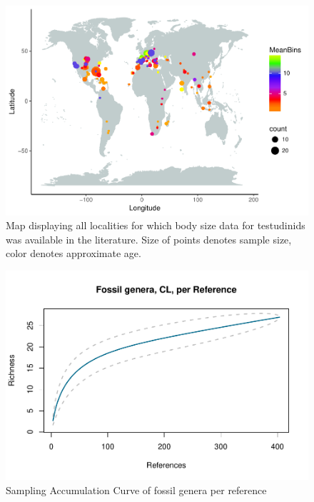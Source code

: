 \begin{figure}[htbp]
	\centering
	\includegraphics{MA_JJ_files/figure-latex/MapCL-1.pdf}
	\caption{Map displaying all localities for which body size data for
		testudinids was available in the literature. Size of points denotes
		sample size, color denotes approximate age.}
\end{figure}




\begin{figure}[htbp]
	\centering
	\includegraphics{MA_JJ_files/figure-latex/SACGenera-1.pdf}
	\caption{Sampling Accumulation Curve of fossil genera per reference}
\end{figure}

\FloatBarrier